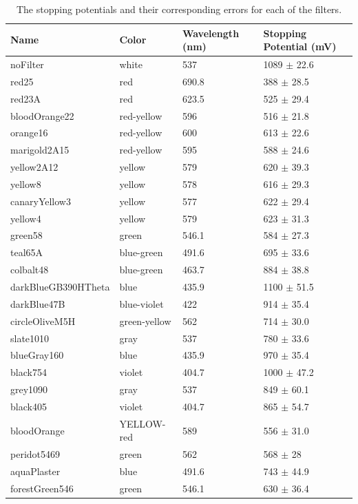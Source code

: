 \documentclass[a4paper]{article}
\begin{document}
\begin{table}[H]
  \caption{The stopping potentials and their corresponding errors for each of
    the filters.}
  \begin{center}
    \begin{tabular}{|l|l|l|l|}
      \hline
      Name & Color & Wavelength (\si{\nano\meter}) & Stopping Potential
                                                     (\si{\milli\volt})  \\
      \hline
      noFilter & white & 537 & 1089 \( \pm \) 22.6 \\
      red25 & red & 690.8 & 388 \( \pm \) 28.5 \\
      red23A & red & 623.5 & 525 \( \pm \) 29.4 \\
      bloodOrange22 & red-yellow & 596 & 516 \( \pm \) 21.8 \\
      orange16 & red-yellow & 600 & 613 \( \pm \) 22.6 \\
      marigold2A15 & red-yellow & 595 & 588 \( \pm \) 24.6 \\
      yellow2A12 & yellow & 579 & 620 \( \pm \) 39.3 \\
      yellow8 & yellow & 578 & 616 \( \pm \) 29.3 \\
      canaryYellow3 & yellow & 577 & 622 \( \pm \) 29.4 \\
      yellow4 & yellow & 579 & 623 \( \pm \) 31.3 \\
      green58 & green & 546.1 & 584 \( \pm \) 27.3 \\
      teal65A & blue-green & 491.6 & 695 \( \pm \) 33.6 \\
      colbalt48 & blue-green & 463.7 & 884 \( \pm \) 38.8 \\
      darkBlueGB390HTheta & blue & 435.9 & 1100 \( \pm \) 51.5 \\
      darkBlue47B & blue-violet & 422 & 914 \( \pm \) 35.4 \\
      circleOliveM5H & green-yellow & 562 & 714 \( \pm \) 30.0 \\
      slate1010 & gray & 537 & 780 \( \pm \) 33.6 \\
      blueGray160 & blue & 435.9 & 970 \( \pm \) 35.4 \\
      black754 & violet & 404.7 & 1000 \( \pm \) 47.2 \\
      grey1090 & gray & 537 & 849 \( \pm \) 60.1 \\
      black405 & violet & 404.7 & 865 \( \pm \) 54.7 \\
      bloodOrange & YELLOW-red & 589 & 556 \( \pm \) 31.0 \\
      peridot5469 & green & 562 & 568 \( \pm \) 28 \\
      aquaPlaster & blue & 491.6 & 743 \( \pm \) 44.9 \\
      forestGreen546 & green & 546.1 & 630 \( \pm \) 36.4 \\
      \hline
    \end{tabular}
  \end{center}
  \label{tab:stoppingPotentials}
\end{table}
 
\end{document}

